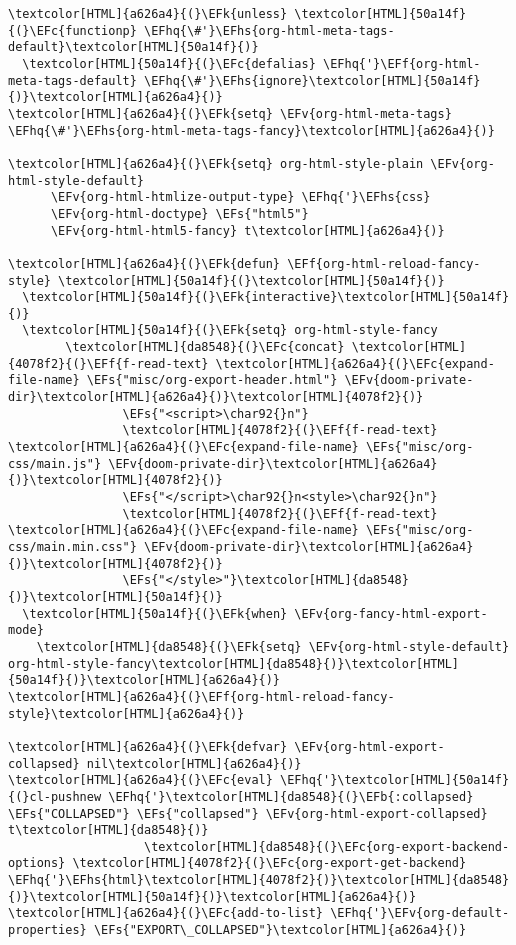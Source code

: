 \documentclass{scrartcl}
\newcommand{\EFk}[1]{\textcolor{EFk}{#1}} %
\newcommand{\EFs}[1]{\textcolor{EFs}{#1}} %
\newcommand{\EFb}[1]{\textcolor{EFb}{#1}} %
\newcommand{\EFc}[1]{\textcolor{EFc}{#1}} %
\newcommand{\EFv}[1]{\textcolor{EFv}{#1}} %
\newcommand{\EFf}[1]{\textcolor{EFf}{#1}} %
\newcommand{\EFhq}[1]{\textcolor{EFhq}{#1}} %
\newcommand{\EFhs}[1]{\textcolor{EFhs}{#1}} %
\begin{document}
\begin{Code}
\begin{Verbatim}[]
\textcolor[HTML]{a626a4}{(}\EFk{unless} \textcolor[HTML]{50a14f}{(}\EFc{functionp} \EFhq{\#'}\EFhs{org-html-meta-tags-default}\textcolor[HTML]{50a14f}{)}
  \textcolor[HTML]{50a14f}{(}\EFc{defalias} \EFhq{'}\EFf{org-html-meta-tags-default} \EFhq{\#'}\EFhs{ignore}\textcolor[HTML]{50a14f}{)}\textcolor[HTML]{a626a4}{)}
\textcolor[HTML]{a626a4}{(}\EFk{setq} \EFv{org-html-meta-tags} \EFhq{\#'}\EFhs{org-html-meta-tags-fancy}\textcolor[HTML]{a626a4}{)}

\textcolor[HTML]{a626a4}{(}\EFk{setq} org-html-style-plain \EFv{org-html-style-default}
      \EFv{org-html-htmlize-output-type} \EFhq{'}\EFhs{css}
      \EFv{org-html-doctype} \EFs{"html5"}
      \EFv{org-html-html5-fancy} t\textcolor[HTML]{a626a4}{)}

\textcolor[HTML]{a626a4}{(}\EFk{defun} \EFf{org-html-reload-fancy-style} \textcolor[HTML]{50a14f}{(}\textcolor[HTML]{50a14f}{)}
  \textcolor[HTML]{50a14f}{(}\EFk{interactive}\textcolor[HTML]{50a14f}{)}
  \textcolor[HTML]{50a14f}{(}\EFk{setq} org-html-style-fancy
        \textcolor[HTML]{da8548}{(}\EFc{concat} \textcolor[HTML]{4078f2}{(}\EFf{f-read-text} \textcolor[HTML]{a626a4}{(}\EFc{expand-file-name} \EFs{"misc/org-export-header.html"} \EFv{doom-private-dir}\textcolor[HTML]{a626a4}{)}\textcolor[HTML]{4078f2}{)}
                \EFs{"<script>\char92{}n"}
                \textcolor[HTML]{4078f2}{(}\EFf{f-read-text} \textcolor[HTML]{a626a4}{(}\EFc{expand-file-name} \EFs{"misc/org-css/main.js"} \EFv{doom-private-dir}\textcolor[HTML]{a626a4}{)}\textcolor[HTML]{4078f2}{)}
                \EFs{"</script>\char92{}n<style>\char92{}n"}
                \textcolor[HTML]{4078f2}{(}\EFf{f-read-text} \textcolor[HTML]{a626a4}{(}\EFc{expand-file-name} \EFs{"misc/org-css/main.min.css"} \EFv{doom-private-dir}\textcolor[HTML]{a626a4}{)}\textcolor[HTML]{4078f2}{)}
                \EFs{"</style>"}\textcolor[HTML]{da8548}{)}\textcolor[HTML]{50a14f}{)}
  \textcolor[HTML]{50a14f}{(}\EFk{when} \EFv{org-fancy-html-export-mode}
    \textcolor[HTML]{da8548}{(}\EFk{setq} \EFv{org-html-style-default} org-html-style-fancy\textcolor[HTML]{da8548}{)}\textcolor[HTML]{50a14f}{)}\textcolor[HTML]{a626a4}{)}
\textcolor[HTML]{a626a4}{(}\EFf{org-html-reload-fancy-style}\textcolor[HTML]{a626a4}{)}

\textcolor[HTML]{a626a4}{(}\EFk{defvar} \EFv{org-html-export-collapsed} nil\textcolor[HTML]{a626a4}{)}
\textcolor[HTML]{a626a4}{(}\EFc{eval} \EFhq{'}\textcolor[HTML]{50a14f}{(}cl-pushnew \EFhq{'}\textcolor[HTML]{da8548}{(}\EFb{:collapsed} \EFs{"COLLAPSED"} \EFs{"collapsed"} \EFv{org-html-export-collapsed} t\textcolor[HTML]{da8548}{)}
                   \textcolor[HTML]{da8548}{(}\EFc{org-export-backend-options} \textcolor[HTML]{4078f2}{(}\EFc{org-export-get-backend} \EFhq{'}\EFhs{html}\textcolor[HTML]{4078f2}{)}\textcolor[HTML]{da8548}{)}\textcolor[HTML]{50a14f}{)}\textcolor[HTML]{a626a4}{)}
\textcolor[HTML]{a626a4}{(}\EFc{add-to-list} \EFhq{'}\EFv{org-default-properties} \EFs{"EXPORT\_COLLAPSED"}\textcolor[HTML]{a626a4}{)}


\end{Verbatim}
\end{Code}
\end{document}
